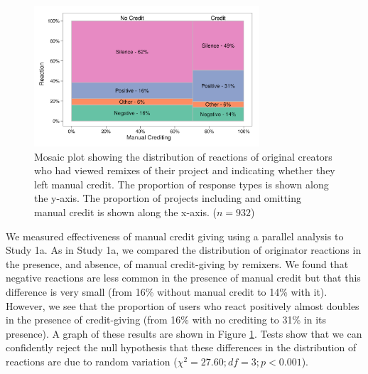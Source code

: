 \begin{figure}
\begin{center}
\includegraphics[width=3.3in]{figures/mosaic_manual_credit.png}
\caption{Mosaic plot showing the distribution of reactions of original
  creators who had viewed remixes of their project and indicating
  whether they left manual credit. The proportion of response types is
  shown along the y-axis. The proportion of projects including and
  omitting manual credit is shown along the x-axis. ($n=932$)}
\label{fig:moscredit}
\end{center}
\end{figure}

We measured effectiveness of manual credit giving using a parallel
analysis to Study 1a. As in Study 1a, we compared the distribution of
originator reactions in the presence, and absence, of manual
credit-giving by remixers. We found that negative reactions are less
common in the presence of manual credit but that this difference is
very small (from 16\% without manual credit to 14\% with it). However,
we see that the proportion of users who react positively almost
doubles in the presence of credit-giving (from 16\% with no crediting
to 31\% in its presence). A graph of these results are shown
in Figure \ref{fig:moscredit}. Tests show that we can confidently
reject the null hypothesis that these differences in the distribution
of reactions are due to random variation ($\chi^2 = 27.60; df=3;
p<0.001$).

